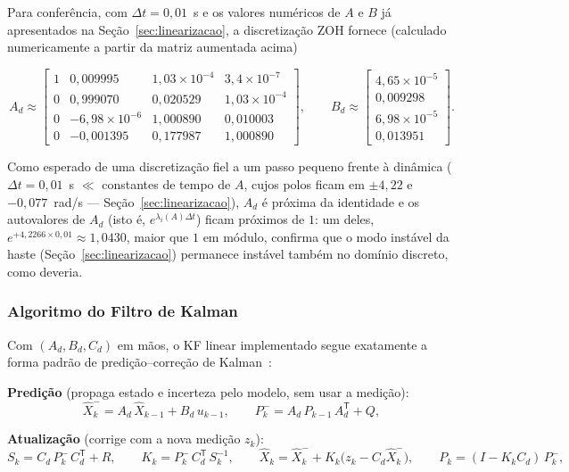 \documentclass[brazil, 12pt]{article}
\begin{document}
Para conferência, com $\Delta t = 0{,}01$~s e os valores numéricos de $A$ e $B$
já apresentados na Seção~\ref{sec:linearizacao}, a discretização ZOH fornece
(calculado numericamente a partir da matriz aumentada acima)

\[
A_d \approx
\begin{bmatrix}
1 & 0{,}009995 & 1{,}03\times10^{-4} & 3{,}4\times10^{-7} \\
0 & 0{,}999070 & 0{,}020529          & 1{,}03\times10^{-4} \\
0 & -6{,}98\times10^{-6} & 1{,}000890 & 0{,}010003 \\
0 & -0{,}001395 & 0{,}177987          & 1{,}000890
\end{bmatrix},
\qquad
B_d \approx
\begin{bmatrix}
4{,}65\times10^{-5} \\ 0{,}009298 \\ 6{,}98\times10^{-5} \\ 0{,}013951
\end{bmatrix}.
\]

Como esperado de uma discretização fiel a um passo pequeno frente à dinâmica
($\Delta t=0{,}01$~s $\ll$ constantes de tempo de $A$, cujos polos ficam em
$\pm4{,}22$ e $-0{,}077$~rad/s — Seção~\ref{sec:linearizacao}), $A_d$ é próxima
da identidade e os autovalores de $A_d$ (isto é, $e^{\lambda_i(A)\Delta t}$)
ficam próximos de $1$: um deles, $e^{+4{,}2266\times0{,}01}\approx1{,}0430$,
maior que $1$ em módulo, confirma que o modo instável da haste
(Seção~\ref{sec:linearizacao}) permanece instável também no domínio discreto,
como deveria.

\subsubsection{Algoritmo do Filtro de Kalman}
\label{sec:kf-algoritmo}

Com $(A_d,B_d,C_d)$ em mãos, o KF linear implementado segue exatamente a forma
padrão de predição--correção de Kalman~\cite{welch1995, simon2006}:

\medskip
\noindent\textbf{Predição} (propaga estado e incerteza pelo modelo, sem usar a medição):
\[
\hat X_{k}^{-} = A_d\,\hat X_{k-1} + B_d\,u_{k-1},
\qquad
P_{k}^{-} = A_d\,P_{k-1}\,A_d^{\mathsf T} + Q,
\]

\noindent\textbf{Atualização} (corrige com a nova medição $z_k$):
\[
S_k = C_d\,P_k^{-}\,C_d^{\mathsf T} + R,
\qquad
K_k = P_k^{-}\,C_d^{\mathsf T}\,S_k^{-1},
\qquad
\hat X_k = \hat X_k^{-} + K_k\big(z_k - C_d\hat X_k^{-}\big),
\qquad
P_k = (I - K_k C_d)\,P_k^{-},
\]
\end{document}
